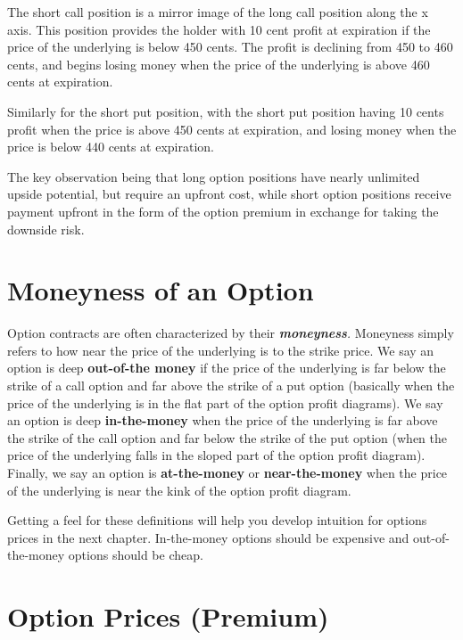 \documentclass[
]{book}
\begin{document}
The short call position is a mirror image of the long call position along the x axis. This position provides the holder with 10 cent profit at expiration if the price of the underlying is below 450 cents. The profit is declining from 450 to 460 cents, and begins losing money when the price of the underlying is above 460 cents at expiration.

Similarly for the short put position, with the short put position having 10 cents profit when the price is above 450 cents at expiration, and losing money when the price is below 440 cents at expiration.

The key observation being that long option positions have nearly unlimited upside potential, but require an upfront cost, while short option positions receive payment upfront in the form of the option premium in exchange for taking the downside risk.

\hypertarget{moneyness-of-an-option}{%
\section{Moneyness of an Option}\label{moneyness-of-an-option}}

Option contracts are often characterized by their \emph{\textbf{moneyness}.} Moneyness simply refers to how near the price of the underlying is to the strike price. We say an option is deep \textbf{out-of-the money} if the price of the underlying is far below the strike of a call option and far above the strike of a put option (basically when the price of the underlying is in the flat part of the option profit diagrams). We say an option is deep \textbf{in-the-money} when the price of the underlying is far above the strike of the call option and far below the strike of the put option (when the price of the underlying falls in the sloped part of the option profit diagram). Finally, we say an option is \textbf{at-the-money} or \textbf{near-the-money} when the price of the underlying is near the kink of the option profit diagram.

Getting a feel for these definitions will help you develop intuition for options prices in the next chapter. In-the-money options should be expensive and out-of-the-money options should be cheap.

\hypertarget{option-prices-premium}{%
\section{Option Prices (Premium)}\label{option-prices-premium}}
\end{document}
